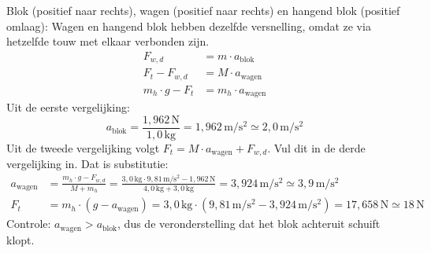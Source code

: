 \documentclass{ximera}
\newcommand{\blokje}[4][left]{\fill (#2,#3) circle (0.05); \node[#1, inner sep=3pt] at (#2,#3) {#4};}
\newcommand{\kr}[7][kracht]{\draw[#1] (#2,#3) -- ++(#4,#5) node[#6] {#7};}
\newcommand{\positiepijl}[6]{\draw[positie, draw=black!50, text=black!50] (#1,#2) -- ++(#3,#4) node[#5] {#6};}
\begin{document}
\begin{exercise}
\begin{question}
\begin{solution}
            \begin{center}
            \end{center}

            Blok (positief naar rechts), wagen (positief naar rechts) en hangend blok (positief omlaag):
            Wagen en hangend blok hebben dezelfde versnelling, omdat ze via hetzelfde touw met elkaar verbonden zijn.
            \begin{align*}
                F_{w,d} &= m \cdot a_{\text{blok}} \\
                F_{t} - F_{w,d} &= M \cdot a_{\text{wagen}} \\
                m_{h} \cdot g - F_{t} &= m_{h} \cdot a_{\text{wagen}}
            \end{align*}
            Uit de eerste vergelijking:
            \[
                a_{\text{blok}} = \frac{1{,}962 \, \mathrm{N}}{1{,}0 \, \mathrm{kg}} = 1{,}962 \, \mathrm{m/s^2} \simeq \boxed{2{,}0 \, \mathrm{m/s^2}}
            \]
            Uit de tweede vergelijking volgt $F_{t} = M \cdot a_{\text{wagen}} + F_{w,d}$. Vul dit in de derde vergelijking in. Dat is substitutie:
            \begin{align*}
                a_{\text{wagen}} &= \frac{m_{h} \cdot g - F_{w,d}}{M + m_{h}} = \frac{3{,}0 \, \mathrm{kg} \cdot 9{,}81 \, \mathrm{m/s^2} - 1{,}962 \, \mathrm{N}}{4{,}0 \, \mathrm{kg} + 3{,}0 \, \mathrm{kg}} = 3{,}924 \, \mathrm{m/s^2} \simeq \boxed{3{,}9 \, \mathrm{m/s^2}} \\
                F_{t} &= m_{h} \cdot (g - a_{\text{wagen}}) = 3{,}0 \, \mathrm{kg} \cdot (9{,}81 \, \mathrm{m/s^2} - 3{,}924 \, \mathrm{m/s^2}) = 17{,}658 \, \mathrm{N} \simeq \boxed{18 \, \mathrm{N}}
            \end{align*}
            Controle: $a_{\text{wagen}} > a_{\text{blok}}$, dus de veronderstelling dat het blok achteruit schuift klopt.
        \end{solution}
    \end{question}
\end{exercise}
\end{document}
